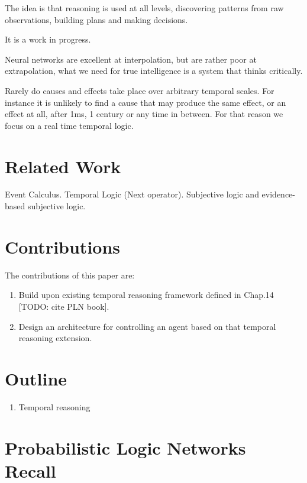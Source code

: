 \documentclass[runningheads]{llncs}
\begin{document}
The idea is that reasoning is used at all levels, discovering patterns
from raw observations, building plans and making decisions.

It is a work in progress.

Neural networks are excellent at interpolation, but are rather poor at
extrapolation, what we need for true intelligence is a system that
thinks critically.

Rarely do causes and effects take place over arbitrary temporal
scales.  For instance it is unlikely to find a cause that may produce
the same effect, or an effect at all, after 1ms, 1 century or any time
in between.  For that reason we focus on a real time temporal logic.

\section{Related Work}

Event Calculus.  Temporal Logic (Next operator).  Subjective logic and
evidence-based subjective logic.

\section{Contributions}

The contributions of this paper are:
\begin{enumerate}
\item Build upon existing temporal reasoning framework defined in
  Chap.14 [TODO: cite PLN book].
\item Design an architecture for controlling an agent based on that
  temporal reasoning extension.
\end{enumerate}

\section{Outline}

\begin{enumerate}
\item Temporal reasoning
\end{enumerate}

\section{Probabilistic Logic Networks Recall}
\end{document}

